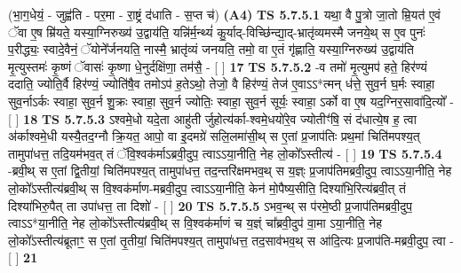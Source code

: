 \documentclass[17pt]{extarticle}
\begin{document}
                      (भा॒ग॒धेयं॒ - जुह्व॑ति - पर॒मा - रा॒ष्ट्रं द॑धाति - स॒प्त च॑)  \textbf{(A4)} \newline \newline
                                        \textbf{ TS 5.7.5.1} \newline
                  यथा॒ वै पु॒त्रो जा॒तो म्रि॒यत॑ ए॒वं ॅवा ए॒ष म्रि॑यते॒ यस्या॒ग्निरुख्य॑ उ॒द्वाय॑ति॒ यन्नि॑र्म॒न्थ्यं॑ कु॒र्याद्-विच्छि॑न्द्या॒द्-भ्रातृ॑व्यमस्मै जनये॒थ् स ए॒व पुनः॑ प॒रीद्ध्यः॒ स्वादे॒वैनं॒ ॅयोने᳚र्जनयति॒ नास्मै॒ भ्रातृ॑व्यं जनयति॒ तमो॒ वा ए॒तं गृ॑ह्णाति॒ यस्या॒ग्निरुख्य॑ उ॒द्वाय॑ति मृ॒त्युस्तमः॑ कृ॒ष्णं ॅवासः॑ कृ॒ष्णा धे॒नुर्दक्षि॑णा॒ तम॑सै॒ - [  ] \textbf{  17} \newline
                  \newline
                                \textbf{ TS 5.7.5.2} \newline
                  -व तमो॑ मृ॒त्युमप॑ हते॒ हिर॑ण्यं ददाति॒ ज्योति॒र्वै हिर॑ण्यं॒ ज्योति॑षै॒व तमोऽप॑ ह॒तेऽथो॒ तेजो॒ वै हिर॑ण्यं॒ तेज॑ ए॒वाऽऽ*त्मन् ध॑त्ते॒ सुव॒र्न घ॒र्मः स्वाहा॒ सुव॒र्नाऽर्कः स्वाहा॒ सुव॒र्न शु॒क्रः स्वाहा॒ सुव॒र्न ज्योतिः॒ स्वाहा॒ सुव॒र्न सूर्यः॒ स्वाहा॒ ऽर्को वा ए॒ष यद॒ग्निर॒सावा॑दि॒त्यो᳚ - [  ] \textbf{  18} \newline
                  \newline
                                \textbf{ TS 5.7.5.3} \newline
                  ऽश्वमे॒धो यदे॒ता आहु॑ती र्जुहोत्य॑र्का-श्वमे॒धयो॑रे॒व ज्योतीꣳ॑षि॒ सं द॑धात्ये॒ष ह॒ त्वा अ॑र्काश्वमे॒धी यस्यै॒तद॒ग्नौ क्रि॒यत॒ आपो॒ वा इ॒दमग्रे॑ सलि॒लमा॑सी॒थ् स ए॒तां प्र॒जाप॑तिः प्रथ॒मां चिति॑मपश्य॒त् तामुपा॑धत्त॒ तदि॒यम॑भव॒त् तं ॅवि॒श्वक॑र्माऽब्रवी॒दुप॒ त्वाऽऽया॒नीति॒ नेह लो॒को᳚ऽस्तीत्य॑ - [  ] \textbf{  19} \newline
                  \newline
                                \textbf{ TS 5.7.5.4} \newline
                  -ब्रवी॒थ् स ए॒तां द्वि॒तीयां॒ चिति॑मपश्य॒त् तामुपा॑धत्त॒ तद॒न्तरि॑क्षमभव॒थ् स य॒ज्ञ्ः प्र॒जाप॑तिमब्रवी॒दुप॒ त्वाऽऽया॒नीति॒ नेह लो॒को᳚ऽस्तीत्य॑ब्रवी॒थ् स वि॒श्वक॑र्माण-मब्रवी॒दुप॒ त्वाऽऽया॒नीति॒ केन॑ मो॒पैष्य॒सीति॒ दिश्या॑भि॒रित्य॑ब्रवी॒त् तं दिश्या॑भिरु॒पैत् ता उपा॑धत्त॒ ता दिशो॑ - [  ] \textbf{  20} \newline
                  \newline
                                \textbf{ TS 5.7.5.5} \newline
                  ऽभव॒न्थ् स प॑रमे॒ष्ठी प्र॒जाप॑तिमब्रवी॒दुप॒ त्वाऽऽ*या॒नीति॒ नेह लो॒को᳚ऽस्तीत्य॑ब्रवी॒थ् स वि॒श्वक॑र्माणं च य॒ज्ञ्ं चा᳚ब्रवी॒दुप॑ वा॒मा ऽया॒नीति॒ नेह लो॒को᳚ऽस्तीत्य॑ब्रूताꣳ॒॒ स ए॒तां तृ॒तीयां॒ चिति॑मपश्य॒त् तामुपा॑धत्त॒ तद॒साव॑भव॒थ् स आ॑दि॒त्यः प्र॒जाप॑ति-मब्रवी॒दुप॒ त्वा - [  ] \textbf{  21} \newline
\end{document}
